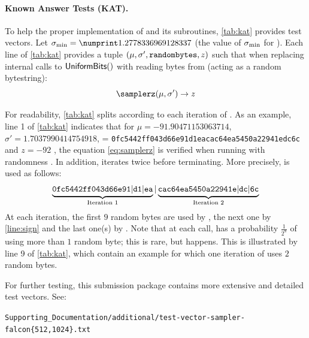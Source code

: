 \paragraph{Known Answer Tests (KAT).} To help the proper implementation of \longsamplerz and its subroutines, \cref{tab:kat} provides test vectors. Let $\sigmin = \sigminvali$ (the value of $\sigma_{\min}$ for ). Each line of \cref{tab:kat} provides a tuple $(\mu, \sigma', \texttt{randombytes}, z)$ such that when replacing internal calls to $\textsf{UniformBits}()$ with reading bytes from \randombytes (acting as a random bytestring):
\begin{equation}\label{eq:samplerz}
	 \samplerz(\mu, \sigma') \rightarrow z
\end{equation}

For readability, \cref{tab:kat} splits \randombytes according to each iteration of \samplerz. As an example, line 1 of \cref{tab:kat} indicates that for $\mu = -91.90471153063714$, $\sigma' = 1.7037990414754918$, \randombytes = {\small \texttt{0fc5442ff043d66e91d1eacac64ea5450a22941edc6c}} and $z = -92$ , the equation \eqref{eq:samplerz} is verified when running \samplerz with randomness \randombytes. In addition, \samplerz iterates twice before terminating. More precisely, \randombytes is used as follows:
\[
\underbrace{\tt 0fc5442ff043d66e91|d1|ea}_{\text{Iteration 1}}| 
\underbrace{\tt cac64ea5450a22941e|dc|6c}_{\text{Iteration 2}}
\]
At each iteration, the first $9$ random bytes are used by \basesampler, the next one by \cref{line:sign} and the last one(s) by \berexp. Note that at each call, \berexp has a probability $\frac{1}{2^8}$ of using more than $1$ random byte; this is rare, but happens. This is illustrated by line 9 of \cref{tab:kat}, which contain an example for which one iteration of \berexp uses $2$ random bytes.

For further testing, this submission package contains more extensive and detailed test vectors. See:
\vspace{-4mm}
\begin{center}
{\small\tt Supporting\_Documentation/additional/test-vector-sampler-falcon\{512,1024\}.txt}
\end{center}


